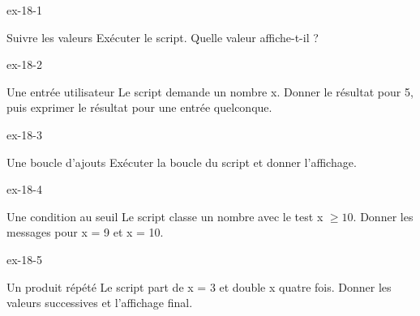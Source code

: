 \clearpage{}
\begin{blocLivre}{ex-18-1}\begin{exercice}[1]{Suivre les valeurs}
Exécuter le script. Quelle valeur affiche-t-il ?
\label{fig-ex-18-1}
\end{exercice}\end{blocLivre}
\begin{blocLivre}{ex-18-2}\begin{exercice}[1]{Une entrée utilisateur}
Le script demande un nombre x. Donner le résultat pour 5, puis exprimer le résultat pour une entrée quelconque.
\label{fig-ex-18-2}
\end{exercice}\end{blocLivre}
\begin{blocLivre}{ex-18-3}\begin{exercice}[1]{Une boucle d’ajouts}
Exécuter la boucle du script et donner l’affichage.
\label{fig-ex-18-3}
\end{exercice}\end{blocLivre}
\begin{blocLivre}{ex-18-4}\begin{exercice}[1]{Une condition au seuil}
Le script classe un nombre avec le test x $\ge10$. Donner les messages pour x = 9 et x = 10.
\label{fig-ex-18-4}
\end{exercice}\end{blocLivre}
\begin{blocLivre}{ex-18-5}\begin{exercice}[1]{Un produit répété}
Le script part de x = 3 et double x quatre fois. Donner les valeurs successives et l’affichage final.
\label{fig-ex-18-5}
\end{exercice}\end{blocLivre}


